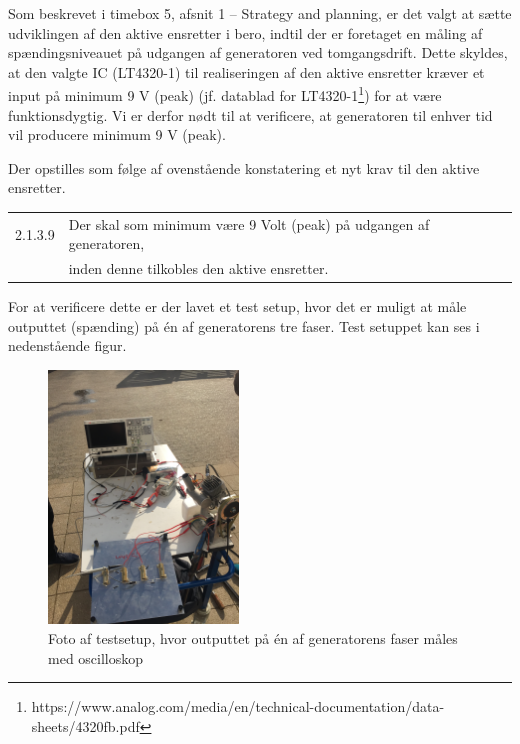 Som beskrevet i timebox 5, afsnit 1 – Strategy and planning, er det valgt at sætte udviklingen af den aktive ensretter i bero, indtil der er foretaget en måling af spændingsniveauet på udgangen af generatoren ved tomgangsdrift. Dette skyldes, at den valgte IC (LT4320-1) til realiseringen af den aktive ensretter kræver et input på minimum 9 V (peak) (jf. datablad for LT4320-1\footnote{https://www.analog.com/media/en/technical-documentation/data-sheets/4320fb.pdf}) for at være funktionsdygtig. Vi er derfor nødt til at verificere, at generatoren til enhver tid vil producere minimum 9 V (peak). 

Der opstilles som følge af ovenstående konstatering et nyt krav til den aktive ensretter.\vspace{5mm}\\
\begin{tabular}[h]{ll}
  2.1.3.9&Der skal som minimum være 9 Volt (peak) på udgangen af generatoren,\\
           &inden denne tilkobles den aktive ensretter.\\
\end{tabular}
\vspace{2em}
\newline
For at verificere dette er der lavet et test setup, hvor det er muligt at måle outputtet (spænding) på én af generatorens tre faser. Test setuppet kan ses i nedenstående figur.

\begin{figure}[h]
  \centering
  \includegraphics[width=0.45\textwidth]{testsetup.JPG}
  \caption{Foto af testsetup, hvor outputtet på én af generatorens faser måles med oscilloskop}
  \label{fig:testsetup}
\end{figure}


